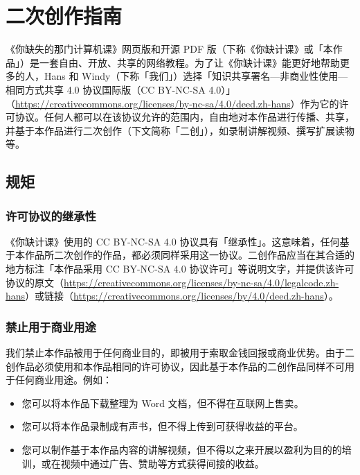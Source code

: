 \chapter{二次创作指南}
\label{cha:adapt-guide}

《你缺失的那门计算机课》网页版和开源 PDF 版（下称《你缺计课》或「本作品」）是一套自由、开放、共享的网络教程。为了让《你缺计课》能更好地帮助更多的人，Hans 和 Windy（下称「我们」）选择「知识共享署名—非商业性使用—相同方式共享 4.0 协议国际版（CC BY-NC-SA 4.0）」（\url{https://creativecommons.org/licenses/by-nc-sa/4.0/deed.zh-hans}）作为它的许可协议。任何人都可以在该协议允许的范围内，自由地对本作品进行传播、共享，并基于本作品进行二次创作（下文简称「二创」），如录制讲解视频、撰写扩展读物等。

\section{规矩}

\subsection{许可协议的继承性}

《你缺计课》使用的 CC BY-NC-SA 4.0 协议具有「继承性」。这意味着，任何基于本作品所二次创作的作品，都必须同样采用这一协议。二创作品应当在其合适的地方标注「本作品采用 CC BY-NC-SA 4.0 协议许可」等说明文字，并提供该许可协议的原文（\url{https://creativecommons.org/licenses/by-nc-sa/4.0/legalcode.zh-hans}）或链接（\url{https://creativecommons.org/licenses/by/4.0/deed.zh-hans}）。

\subsection{禁止用于商业用途}

我们禁止本作品被用于任何商业目的，即被用于索取金钱回报或商业优势。由于二创作品必须使用和本作品相同的许可协议，因此基于本作品的二创作品同样不可用于任何商业用途。例如：

\begin{itemize}
  \item 您可以将本作品下载整理为 Word 文档，{\color{MissingRed}但不得在互联网上售卖}。
  \item 您可以将本作品录制成有声书，{\color{MissingRed}但不得上传到可获得收益的平台}。
  \item 您可以制作基于本作品内容的讲解视频，{\color{MissingRed}但不得以之来开展以盈利为目的的培训，或在视频中通过广告、赞助等方式获得间接的收益}。
\end{itemize}

